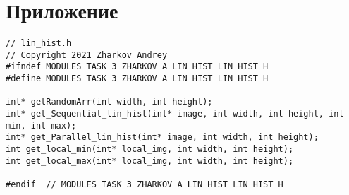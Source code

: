 \documentclass{report}
\begin{document}
\section*{Приложение}
\begin{lstlisting}
// lin_hist.h
// Copyright 2021 Zharkov Andrey
#ifndef MODULES_TASK_3_ZHARKOV_A_LIN_HIST_LIN_HIST_H_
#define MODULES_TASK_3_ZHARKOV_A_LIN_HIST_LIN_HIST_H_

int* getRandomArr(int width, int height);
int* get_Sequential_lin_hist(int* image, int width, int height, int min, int max);
int* get_Parallel_lin_hist(int* image, int width, int height);
int get_local_min(int* local_img, int width, int height);
int get_local_max(int* local_img, int width, int height);

#endif  // MODULES_TASK_3_ZHARKOV_A_LIN_HIST_LIN_HIST_H_

\end{lstlisting}
\newpage
\end{document}
